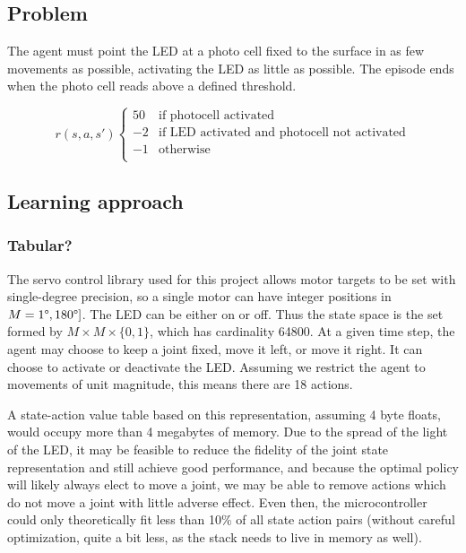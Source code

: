 \documentclass{article}
\begin{document}
	\subsection{Problem}
	
	The agent must point the LED at a photo cell fixed to the surface in as few movements as possible, activating the LED as little as possible. The episode ends when the photo cell reads above a defined threshold. 
	
	\[ r(s,a,s')  \left\{
	\begin{array}{ll}
		50 & \text{if photocell activated} \\
		-2 & \text{if LED activated and photocell not activated} \\
		-1 & \text{otherwise} \\
	\end{array} 
	\right. \]
	
	
	\subsection{Learning approach}
	
	\subsubsection{Tabular?}
	
	The servo control library used for this project allows motor targets to be set with single-degree precision, so a single motor can have integer positions in $M = {1\degree, 180\degree]}$. The LED can be either on or off. Thus the state space is the set formed by $M \times M \times \{0,1\}$, which has cardinality 64800. At a given time step, the agent may choose to keep a joint fixed, move it left, or move it right. It can choose to activate or deactivate the LED. Assuming we restrict the agent to movements of unit magnitude, this means there are 18 actions.

	A state-action value table based on this representation, assuming 4 byte floats, would occupy more than 4 megabytes of memory. Due to the spread of the light of the LED, it may be feasible to reduce the fidelity of the joint state representation and still achieve good performance, and because the optimal policy will likely always elect to move a joint, we may be able to remove actions which do not move a joint with little adverse effect. Even then, the microcontroller could only theoretically fit less than 10\% of all state action pairs (without careful optimization, quite a bit less, as the stack needs to live in memory as well).
	
\end{document}
